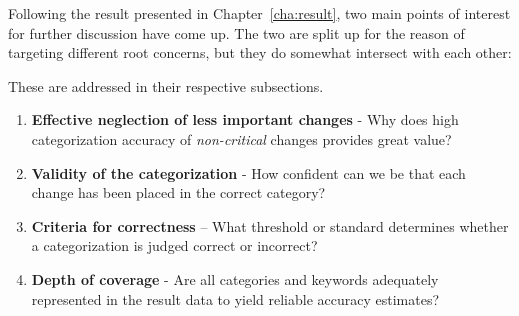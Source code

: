 Following the result presented in Chapter~\ref{cha:result}, two main points of interest for further discussion have come up. The two are split up for the reason of targeting different root concerns, but they do somewhat intersect with each other:

\begin{explanation}
    These are addressed in their respective subsections.
    \begin{enumerate}
        \item \textbf{Effective neglection of less important changes} - Why does high categorization accuracy of \textit{non-critical} changes provides great value?
        
        \item \textbf{Validity of the categorization} - How confident can we be that each change has been placed in the correct category?
    
        \item \textbf{Criteria for correctness} – What threshold or standard determines whether a categorization is judged correct or incorrect?

        \item \textbf{Depth of coverage} - Are all categories and keywords adequately represented in the result data to yield reliable accuracy estimates?
    \end{enumerate}
\end{explanation}

